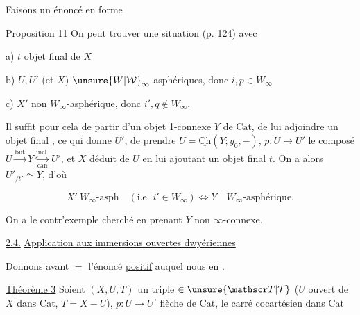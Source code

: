 
Faisons un énoncé en forme

\uline{Proposition 11} On peut trouver une situation  (p. 124) avec

a) $t$ objet final de $X$

b) $U,U'$ (et $X$) $\unsure{W|\mathcal W}_\infty$-asphériques, donc $i,p\in W_\infty$ 

c) $X'$ non $W_\infty$-asphérique, donc $i',q\notin W_\infty$.

Il suffit pour cela de partir d'un objet 1-connexe  $Y$ de $\mathrm{Cat}$, de lui adjoindre un objet final , ce qui donne $U'$, de prendre $U=\underline{\mathrm{Ch}}(Y;y_0,-)$, $p:U\to U'$ le composé $U\xrightarrow{\mathrm{but}}Y\mathrel{\mathop{\hookrightarrow}\limits^{\mathrm{incl.}}_{\mathrm{can}}}U'$, et $X$  déduit de $U$ en lui ajoutant un objet final $t$. On a alors $U'_{/t'}\simeq Y$,  d'où

\[
 X'\ W_\infty\text{-asph}\quad (\text{i.e. }i'\in W_\infty)\Longleftrightarrow Y\quad W_\infty\text{-asphérique.}
\]

On a le contr'exemple cherché en prenant $Y$  non $\infty$-connexe.

\uline{2.4.} \uline{Application aux immersions ouvertes dwyériennes}

Donnons avant $=$ l'énoncé \uline{positif} auquel nous en .

\uline{Théorème 3} Soient $(X,U,T)$ un triple $\in\unsure{\mathscr T|\mathcal T}$ ($U$ ouvert de $X$ dans $\mathrm{Cat}$, $T=X-U$),  $p:U\longrightarrow U'$  flèche de $\mathrm{Cat}$,  le carré cocartésien dans $\mathrm{Cat}$

